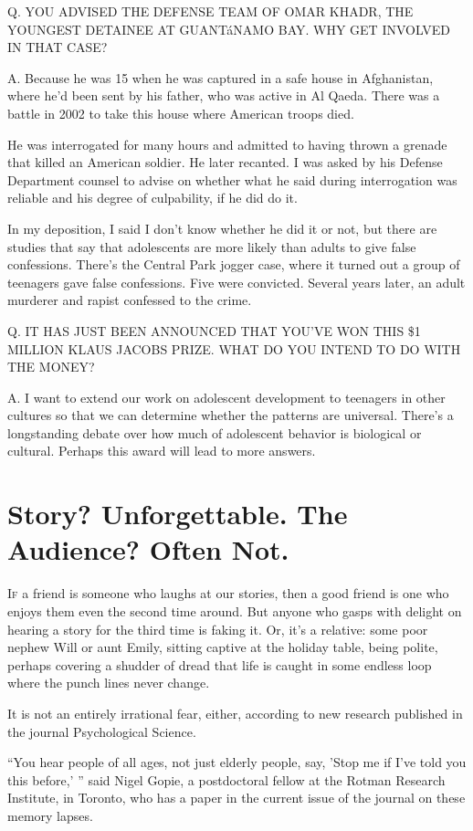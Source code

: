 ﻿\documentclass[12pt]{article}
\begin{document}
Q. YOU ADVISED THE DEFENSE TEAM OF OMAR KHADR, THE YOUNGEST DETAINEE AT GUANT\'aNAMO BAY. WHY GET
INVOLVED IN THAT CASE?

A. Because he was 15 when he was captured in a safe house in Afghanistan, where he'd been sent by
his father, who was active in Al Qaeda. There was a battle in 2002 to take this house where American
troops died.

He was interrogated for many hours and admitted to having thrown a grenade that killed an American
soldier. He later recanted. I was asked by his Defense Department counsel to advise on whether what
he said during interrogation was reliable and his degree of culpability, if he did do it.

In my deposition, I said I don't know whether he did it or not, but there are studies that say that
adolescents are more likely than adults to give false confessions. There's the Central Park jogger
case, where it turned out a group of teenagers gave false confessions. Five were convicted. Several
years later, an adult murderer and rapist confessed to the crime.

Q. IT HAS JUST BEEN ANNOUNCED THAT YOU'VE WON THIS \$1 MILLION KLAUS JACOBS PRIZE. WHAT DO YOU
INTEND TO DO WITH THE MONEY?

A. I want to extend our work on adolescent development to teenagers in other cultures so that we can
determine whether the patterns are universal. There's a longstanding debate over how much of
adolescent behavior is biological or cultural. Perhaps this award will lead to more answers.

\section{Story? Unforgettable. The Audience? Often Not.}

\lettrine{I}{f} a friend is someone who laughs at our stories, then a good
friend is one who enjoys them even the second time around. But anyone who gasps with delight on
hearing a story for the third time is faking it. Or, it's a relative: some poor nephew Will or aunt
Emily, sitting captive at the holiday table, being polite, perhaps covering a shudder of dread that
life is caught in some endless loop where the punch lines never change.

It is not an entirely irrational fear, either, according to new research published in the journal
Psychological Science.

``You hear people of all ages, not just elderly people, say, 'Stop me if I've told you this before,'
'' said Nigel Gopie, a postdoctoral fellow at the Rotman Research Institute, in Toronto, who has a
paper in the current issue of the journal on these memory lapses.
\end{document}
